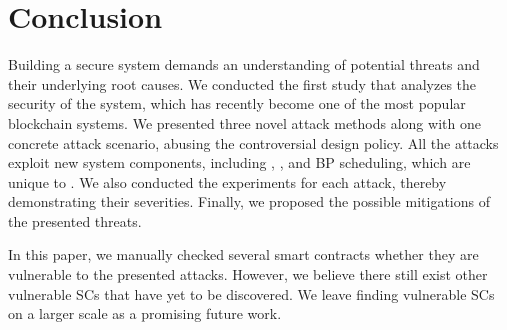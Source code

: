 \chapter*{Conclusion} %

Building a secure system demands an understanding of potential threats and their 
underlying root causes.
%
We conducted the first study that analyzes the security of the \eos system,
which has recently become one of the most popular blockchain systems. We 
presented three novel attack methods along with one concrete attack scenario, 
abusing the controversial \eos design policy. All the attacks exploit new
system components, including \cpu, \ram, and BP scheduling, which are unique to 
\eos. We also conducted the experiments for each attack, thereby demonstrating
their severities. 
%
Finally, we proposed the possible mitigations of the presented threats.

In this paper, we manually checked several smart contracts whether they are
vulnerable to the presented attacks. However, we believe there still exist
other vulnerable SCs that have yet to be discovered. We leave finding vulnerable \eos
SCs on a larger scale as a promising future work.


